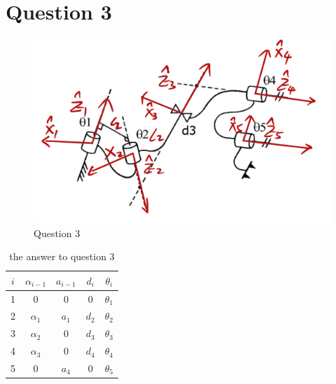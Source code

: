 \documentclass{article}
\begin{document}
\section*{Question 3}
\begin{figure}[H]
    \centering
    \includegraphics[width=0.5\linewidth]{picture/Question3.png}
    \caption{Question 3}
    \label{fig:placeholder}
\end{figure}

\begin{table}[H]
    \centering
    \begin{tabular}{|c|c|c|c|c|}
    \hline
         $i$ & $\alpha_{i-1}$ & $a_{i-1}$ & $d_{i}$ & $\theta_{i}$ \\ \hline
         1 & 0 & 0 & 0 & $\theta_{1}$ \\ \hline
         2 & $\alpha_{1}$ & $a_{1}$ & $d_{2}$ & $\theta_{2}$ \\ \hline
         3 & $\alpha_{2}$ & 0 & $d_{3}$ & $\theta_{3}$ \\ \hline
         4 & $\alpha_{3}$ & 0 & $d_{4}$ & $\theta_{4}$ \\ \hline
         5 & 0 & $a_{4}$ & 0 & $\theta_{5}$ \\ \hline
    \end{tabular}
    \caption{the answer to question 3}
    \label{tab:placeholder}
\end{table}
\end{document}
